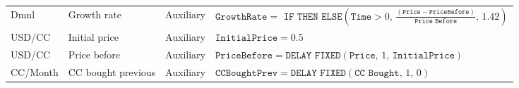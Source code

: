 \begin{longtable}[c]{p{1.71cm}p{2cm}p{1.5cm}p{11cm}}
Dmnl           & Growth rate          & Auxiliary                 & \small$\displaystyle\texttt{GrowthRate} =\texttt{ IF THEN ELSE}( \texttt{Time} > 0 ,\, \frac{(\texttt{Price}-\texttt{PriceBefore})}{\texttt{Price Before}},\, 1.42 )$                                                                                                                                                                                       \\[4mm]
USD/CC         & Initial price        & Auxiliary                 & \small$\displaystyle\texttt{InitialPrice}= 0.5$                                                                                                                                                                                                                                                                                                 \\[4mm]
USD/CC         & Price before         & Auxiliary                 & \small$\displaystyle\texttt{PriceBefore}= \texttt{DELAY FIXED}(\texttt{Price} ,\, 1 ,\, \texttt{InitialPrice})$                                                                                                                                                                                                                                            \\[4mm]
CC/Month       & CC bought previous   & Auxiliary                 & \small$\displaystyle\texttt{CCBoughtPrev}=\texttt{DELAY FIXED}(\texttt{CC Bought} ,\, 1 ,\, 0)$                                                                                                                                                                                                                                                \\ \hline
\end{longtable}
